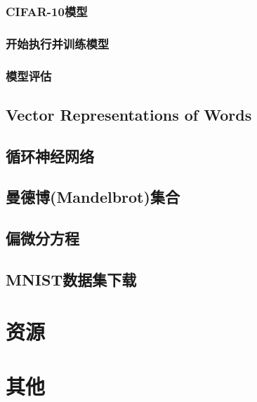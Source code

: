 \documentclass[a4paper,11pt,twoside]{ctexbook}
\begin{document}
\subsection {CIFAR-10模型}
\subsection {开始执行并训练模型}
\subsection {模型评估}
\section {Vector Representations of Words}
\section {循环神经网络}
\section {曼德博(Mandelbrot)集合}
\section {偏微分方程}
\section {MNIST数据集下载}


\newpage



% 


\newpage
\chapter{资源}

\newpage
\chapter{其他}
\end{document}
